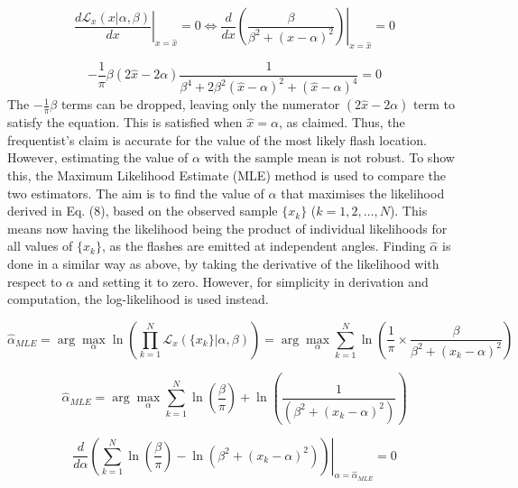 \documentclass[12pt]{report} %
\begin{document}
\begin{equation}
    \left. \frac{d\mathcal{L}_{x}(x|\alpha, \beta)}{dx} \right|_{x = \hat{x}} = 0 \iff \left. \frac{d}{dx} \left(\frac{\beta}{\beta^{2} + (x - \alpha)^{2}}\right) \right|_{x = \hat{x}} = 0
\end{equation}

\begin{equation}
    -\frac{1}{\pi} \beta (2\hat{x} - 2\alpha)\frac{1}{\beta^{4} + 2\beta^{2}(\hat{x} - \alpha)^{2} + (\hat{x} - \alpha)^{4}} = 0
\end{equation}
\newline
The $-\frac{1}{\pi} \beta$ terms can be dropped, leaving only the numerator $(2\hat{x} - 2\alpha)$ term to satisfy the equation. This is satisfied when $\hat{x} = \alpha$, as claimed. Thus, the frequentist's claim is accurate for the value of the most likely flash location. However, estimating the value of $\alpha$ with the sample mean is not robust. To show this, the Maximum Likelihood Estimate (MLE) method is used to compare the two estimators. The aim is to find the value of $\alpha$ that maximises the likelihood derived in Eq. (8), based on the observed sample $\{x_k\}$ ($k = 1, 2,\dots, N$). This means now having the likelihood being the product of individual likelihoods for all values of $\{x_k\}$, as the flashes are emitted at independent angles. Finding $\hat{\alpha}$ is done in a similar way as above, by taking the derivative of the likelihood with respect to $\alpha$ and setting it to zero. However, for simplicity in derivation and computation, the log-likelihood is used instead.

\begin{equation}
    \hat{\alpha}_{MLE} = \arg \max_{\alpha} \ln(\prod_{k=1}^{N}  \mathcal{L}_{x}(\{x_{k}\}|\alpha, \beta)) = \arg \max_{\alpha} \sum_{k=1}^{N} \ln(\frac{1}{\pi} \times \frac{\beta}{\beta^{2} + (x_{k} - \alpha)^{2}})
\end{equation}

\begin{equation}
    \hat{\alpha}_{MLE} = \arg \max_{\alpha} \sum_{k=1}^{N} \ln(\frac{\beta}{\pi}) + \ln(\frac{1}{(\beta^{2} + (x_{k} - \alpha)^{2})})
\end{equation}

\begin{equation}
    \left. \frac{d}{d\alpha} \left( \sum_{k=1}^{N} \ln(\frac{\beta}{\pi}) - \ln(\beta^{2} + (x_{k} - \alpha)^{2}) \right) \right|_{\alpha = \hat{\alpha}_{MLE}} = 0
\end{equation}
\end{document}
